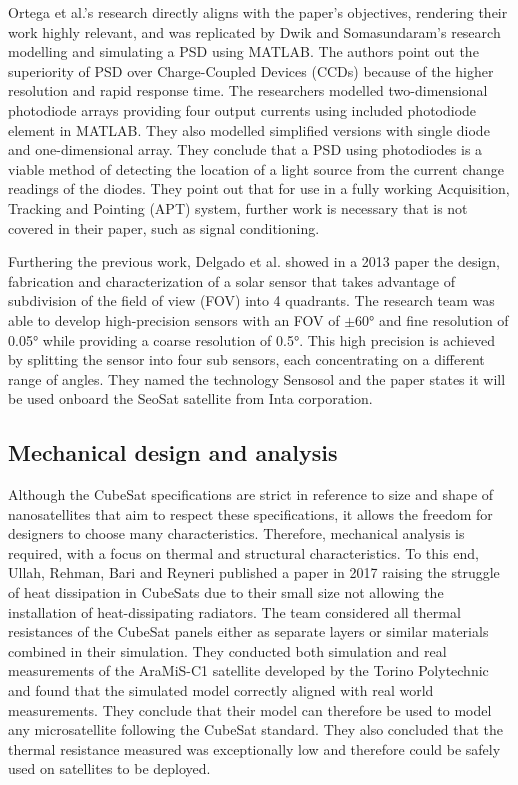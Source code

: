Ortega et al.'s research directly aligns with the paper's objectives, rendering their work highly relevant, and was replicated by Dwik and Somasundaram's research modelling and simulating a PSD using MATLAB. The authors point out the superiority of PSD over Charge-Coupled Devices (CCDs) because of the higher resolution and rapid response time. The researchers modelled two-dimensional photodiode arrays providing four output currents using included photodiode element in MATLAB. They also modelled simplified versions with single diode and one-dimensional array. They conclude that a PSD using photodiodes is a viable method of detecting the location of a light source from the current change readings of the diodes. They point out that for use in a fully working Acquisition, Tracking and Pointing (APT) system, further work is necessary that is not covered in their paper, such as signal conditioning. 

Furthering the previous work, Delgado et al. showed in a 2013 paper the design, fabrication and characterization of a solar sensor that takes advantage of subdivision of the field of view (FOV) into 4 quadrants. The research team was able to develop high-precision sensors with an FOV of $\pm$60° and fine resolution of 0.05° while providing a coarse resolution of 0.5°. This high precision is achieved by splitting the sensor into four sub sensors, each concentrating on a different range of angles. They named the technology Sensosol and the paper states it will be used onboard the SeoSat satellite from Inta corporation.

\subsection{Mechanical design and analysis}
Although the CubeSat specifications are strict in reference to size and shape of nanosatellites that aim to respect these specifications, it allows the freedom for designers to choose many characteristics. Therefore, mechanical analysis is required, with a focus on thermal and structural characteristics. To this end, Ullah, Rehman, Bari and Reyneri published a paper in 2017 raising the struggle of heat dissipation in CubeSats due to their small size not allowing the installation of heat-dissipating radiators. The team considered all thermal resistances of the CubeSat panels either as separate layers or similar materials combined in their simulation. They conducted both simulation and real measurements of the AraMiS-C1 satellite developed by the Torino Polytechnic and found that the simulated model correctly aligned with real world measurements. They conclude that their model can therefore be used to model any microsatellite following the CubeSat standard. They also concluded that the thermal resistance measured was exceptionally low and therefore could be safely used on satellites to be deployed. 

